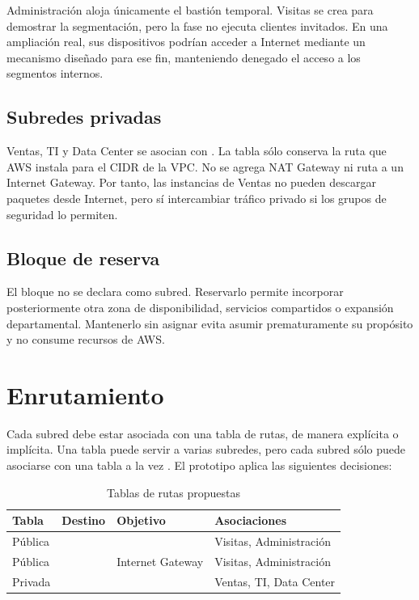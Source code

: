 Administración aloja únicamente el bastión temporal. Visitas se crea para demostrar la segmentación, pero la fase no ejecuta clientes invitados. En una ampliación real, sus dispositivos podrían acceder a Internet mediante un mecanismo diseñado para ese fin, manteniendo denegado el acceso a los segmentos internos.

\subsection{Subredes privadas}

Ventas, TI y Data Center se asocian con . La tabla sólo conserva la ruta  que AWS instala para el CIDR de la VPC. No se agrega NAT Gateway ni ruta a un Internet Gateway. Por tanto, las instancias de Ventas no pueden descargar paquetes desde Internet, pero sí intercambiar tráfico privado si los grupos de seguridad lo permiten.

\subsection{Bloque de reserva}

El bloque  no se declara como subred. Reservarlo permite incorporar posteriormente otra zona de disponibilidad, servicios compartidos o expansión departamental. Mantenerlo sin asignar evita asumir prematuramente su propósito y no consume recursos de AWS.

\section{Enrutamiento}

Cada subred debe estar asociada con una tabla de rutas, de manera explícita o implícita. Una tabla puede servir a varias subredes, pero cada subred sólo puede asociarse con una tabla a la vez \cite{aws-route-tables}. El prototipo aplica las siguientes decisiones:

\begin{table}[H]
\centering
\caption{Tablas de rutas propuestas}
\begin{tabularx}{\textwidth}{p{3.2cm}p{3.1cm}p{3.3cm}Y}
\toprule
\textbf{Tabla} & \textbf{Destino} & \textbf{Objetivo} & \textbf{Asociaciones} \\
\midrule
Pública &  &  & Visitas, Administración \\
Pública &  & Internet Gateway & Visitas, Administración \\
Privada &  &  & Ventas, TI, Data Center \\
\bottomrule
\end{tabularx}
\end{table}

